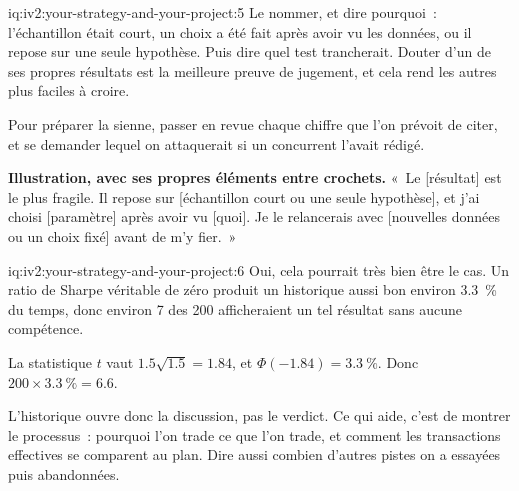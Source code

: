 \begin{solution}{iq:iv2:your-strategy-and-your-project:5}
Le nommer, et dire pourquoi~: l'échantillon était court, un choix a été fait après avoir vu les données, ou il repose sur une seule hypothèse. Puis dire quel test trancherait. Douter d'un de ses propres résultats est la meilleure preuve de jugement, et cela rend les autres plus faciles à croire.

Pour préparer la sienne, passer en revue chaque chiffre que l'on prévoit de citer, et se demander lequel on attaquerait si un concurrent l'avait rédigé.

\textbf{Illustration, avec ses propres éléments entre crochets.} «~Le [résultat] est le plus fragile. Il repose sur [échantillon court ou une seule hypothèse], et j'ai choisi [paramètre] après avoir vu [quoi]. Je le relancerais avec [nouvelles données ou un choix fixé] avant de m'y fier.~»

\end{solution}

\begin{solution}{iq:iv2:your-strategy-and-your-project:6}
Oui, cela pourrait très bien être le cas. Un ratio de Sharpe véritable de zéro produit un historique aussi bon environ 3.3~\% du temps, donc environ 7 des 200 afficheraient un tel résultat sans aucune compétence.

La statistique $t$ vaut $1.5\sqrt{1.5} = 1.84$, et $\Phi(-1.84) = 3.3~\%$. Donc $200 \times 3.3~\% = 6.6$.

L'historique ouvre donc la discussion, pas le verdict. Ce qui aide, c'est de montrer le processus~: pourquoi l'on trade ce que l'on trade, et comment les transactions effectives se comparent au plan. Dire aussi combien d'autres pistes on a essayées puis abandonnées.

\end{solution}

